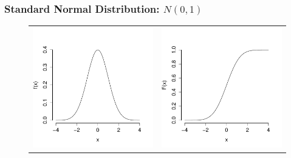 \documentclass[handout]{beamer}
\begin{document}
\begin{frame}
  \frametitle{Standard Normal Distribution: $N(0,1)$}
\begin{figure}[h]
  \centering
  \begin{tabular}{cc}
  \includegraphics[scale = 0.3]{./images/std_normal_PDF}
  &  
  \includegraphics[scale = 0.3]{./images/std_normal_CDF}

\end{tabular}
\end{figure}
\end{frame}
\end{document}
